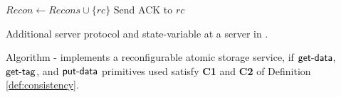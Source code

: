 \begin{algorithm}[!ht]
\begin{algorithmic}[2]
\begin{multicols}{2}
{				 \EndIf
                                        \EndIf
				                  
				         \label{line:statetransfer:notify:begin}        
				                      \State $Recon \gets Recons \cup \{ rc\}$
				                      \State Send ACK to $rc$  \label{line:statetransfer:notify:end}
				     \EndIf
	                   \EndIf
			\EndReceiv
%			
%			
%			
%			
%			
%			
		}\end{multicols}	
	\end{algorithmic}
	\caption{Additional server protocol and state-variable at a server in  \treas.}
	\label{algo:server:statetransfer:treas}
	\vspace{-1em}
\end{algorithm}

\begin{theorem}[Atomicity]\label{safety:ares:treas}
	Algorithm \ares-\treas{} implements a reconfigurable atomic storage service, if 
	$\act{get-data}$, $\act{get-tag}$, and $\act{put-data}$ primitives used satisfy 
	\textbf{C1} and \textbf{C2}  of Definition \ref{def:consistency}.
\end{theorem}














